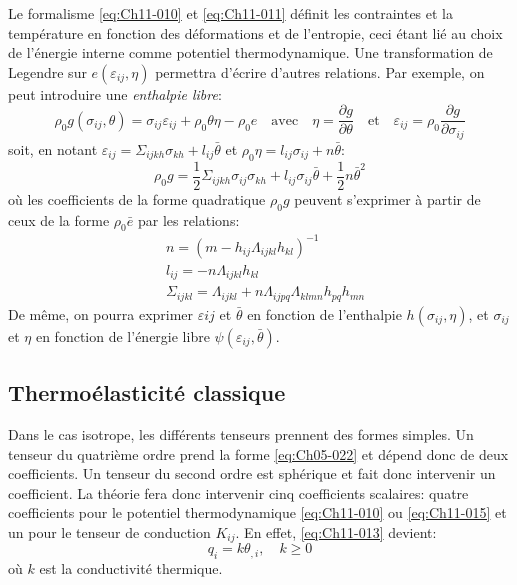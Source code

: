 Le formalisme \eqref{eq:Ch11-010} et \eqref{eq:Ch11-011} définit les contraintes et la température en fonction des déformations et de l'entropie, ceci étant lié au choix de l'énergie interne comme potentiel thermodynamique.
Une transformation de Legendre sur $e(\varepsilon_{ij},\eta)$ permettra d'écrire d'autres relations.
Par exemple, on peut introduire une \emph{enthalpie libre}:
\begin{equation}
    \rho_0 g(\sigma_{ij},\theta) = \sigma_{ij}\varepsilon_{ij} + \rho_0 \theta \eta - \rho_0 e \quad\text{avec}\quad
    \eta = \frac{\partial g}{\partial \theta} \quad\text{et}\quad \varepsilon_{ij} = \rho_0 \frac{\partial g}{\partial \sigma_{ij}}
    \label{eq:Ch11-014}
\end{equation}
soit, en notant $\varepsilon_{ij} = \Sigma_{ijkh} \sigma_{kh} + l_{ij} \bar{\theta}$ et $\rho_0 \eta = l_{ij} \sigma_{ij} + n \bar{\theta}$:
\begin{equation}
    \rho_0 g = \frac{1}{2} \Sigma_{ijkh} \sigma_{ij}\sigma_{kh} + l_{ij} \sigma_{ij} \bar{\theta} +\frac{1}{2} n \bar{\theta}^2
    \label{eq:Ch11-015}
\end{equation}
où les coefficients de la forme quadratique $\rho_0 g$ peuvent s'exprimer à partir de ceux de la forme $\rho_0 \bar{e}$ par les relations: 
\begin{equation}
  \begin{aligned}
    &n              =  \left(m - h_{ij} \Lambda_{ijkl} h_{kl}\right)^{-1} \\
    &l_{ij}         = -n \Lambda_{ijkl} h_{kl} \\
    &\Sigma_{ijkl}  =  \Lambda_{ijkl} + n \Lambda_{ijpq}\Lambda_{klmn} h_{pq} h_{mn}
  \end{aligned}
    \label{eq:Ch11-016}
\end{equation}
De même, on pourra exprimer $\varepsilon{ij}$ et $\bar{\theta}$ en fonction de l'enthalpie $h(\sigma_{ij},\eta)$, et $\sigma_{ij}$ et $\eta$ en fonction de l'énergie libre $\psi(\varepsilon_{ij},\bar{\theta})$. 
\subsection{Thermoélasticité classique}\label{ssec:Ch11-1.2} 
Dans le cas isotrope, les différents tenseurs prennent des formes simples.
Un tenseur du quatrième ordre prend la forme \eqref{eq:Ch05-022} et dépend donc de deux coefficients.
Un tenseur du second ordre est sphérique et fait donc intervenir un coefficient.
La théorie fera donc intervenir cinq coefficients scalaires: quatre coefficients pour le potentiel thermodynamique \eqref{eq:Ch11-010} ou \eqref{eq:Ch11-015} et un pour le tenseur de conduction $K_{ij}$.
En effet, \eqref{eq:Ch11-013} devient:
\begin{equation}
    q_i = k \theta_{,i}, \quad k \geq 0
    \label{eq:Ch11-018}
\end{equation}
où $k$ est la conductivité thermique. 

